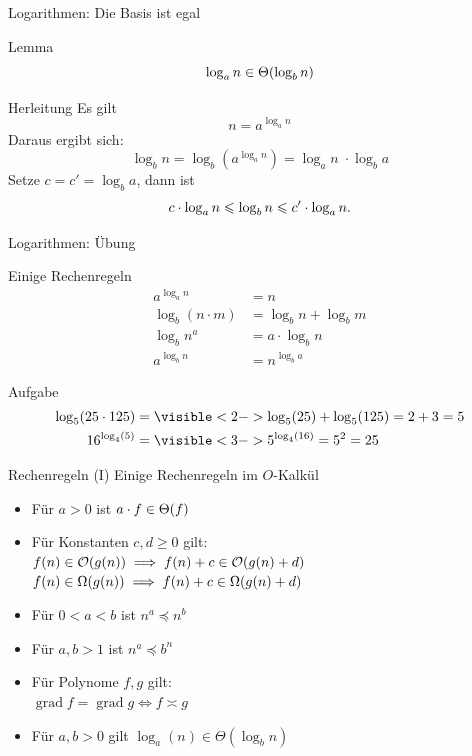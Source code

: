 \begin{frame}{Logarithmen: Die Basis ist egal}
	\begin{block}{Lemma}
		$$ \log_a n \in \Theta\!\left(\log_b n\right) $$
	\end{block}
	
	\begin{block}{Herleitung}
		Es gilt $$n = a^{\log_a n}$$ \pause
		Daraus ergibt sich: $$ \log_b n = \log_b \left(a^{\log_a n}\right) = \log_a n \; \cdot \log_b a $$ \pause 
		Setze $c = c' = \log_b a$, dann ist $$c \cdot \log_a n \leqslant \log_b n \leqslant c' \cdot \log_a n.$$
	\end{block}
\end{frame}



\begin{frame}{Logarithmen: Übung}
	\begin{block}{Einige Rechenregeln}
		\begin{align*}
			a^{\log_a n} &= n\\
			\log_b (n \cdot m) &= \log_b n + \log_b m\\ 
			\log_b n^a &= a \cdot \log_b n  \\
			a^{\log_b n} &= n^{\log_b a} 
		\end{align*}
	\end{block}

	\begin{block}{Aufgabe}
		\begin{align*}
			\log_5(25 \cdot 125) &= \visible<2->{\log_5(25) + \log_5(125) = 2+3 = 5}\\
			16^{\log_4(5)} &= \visible<3->{5^{\log_4(16)} = 5^2 = 25}
		\end{align*}
	\end{block}
\end{frame}

\begin{frame}{Rechenregeln (I)}
	Einige Rechenregeln im $O$-Kalkül
	\begin{itemize}[<+->]
		\item Für $a > 0$ ist $a \cdot f \in \Theta\!\left(f\right)$ 
		\item Für Konstanten $c, d \geq 0$ gilt: \\ 
			\quad $f(n) \in \Oh{g(n)} \Impl f(n) + c \in \Oh{g(n) + d}$ \\
			\quad $f(n) \in \Om{g(n)} \Impl f(n) + c \in \Om{g(n) + d}$ \\
		\item Für $0 < a < b$ ist $n^a \preceq n^b$
		\item Für $a,b > 1$ ist $n^a \preceq b^n$ 
		\item Für Polynome $f,g$ gilt: \\
			\quad $\mathop{\text{grad}} f = \mathop{\text{grad}} g \iff f \asymp g $
		\item Für $a,b > 0$ gilt $\log_a(n) \in \Theta(\log_b n)$
		
	\end{itemize}
\end{frame}


